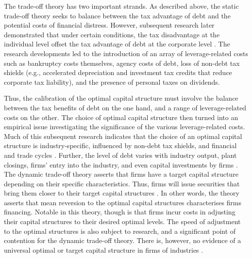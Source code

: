 \documentclass[a4paper, nobind]{templates/ociamthesis}
\begin{document}
The trade-off theory has two important strands. As described above, the static trade-off theory seeks to balance between the tax advantage of debt and the potential costs of financial distress. However, subsequent research later demonstrated that under certain conditions, the tax disadvantage at the individual level offset the tax advantage of debt at the corporate level \autocite{bradley1984existence}. The research developments led to the introduction of an array of leverage-related costs such as bankruptcy costs themselves, agency costs of debt, loss of non-debt tax shields (e.g., accelerated depreciation and investment tax credits that reduce corporate tax liability), and the presence of personal taxes on dividends.

Thus, the calibration of the optimal capital structure must involve the balance between the tax benefits of debt on the one hand, and a range of leverage-related costs on the other. The choice of optimal capital structure then turned into an empirical issue investigating the significance of the various leverage-related costs. Much of this subsequent research indicates that the choice of an optimal capital structure is industry-specific, influenced by non-debt tax shields, and financial and trade cycles \autocite{miao2005optimal}. Further, the level of debt varies with industry output, plant closings, firms' entry into the industry, and even capital investments by firms \autocite{myers2001capital}.
The dynamic trade-off theory asserts that firms have a target capital structure depending on their specific characteristics. Thus, firms will issue securities that bring them closer to their target capital structures \autocite{elsas2014financing}. In other words, the theory asserts that mean reversion to the optimal capital structures characterises firms financing. Notable in this theory, though is that firms incur costs in adjusting their capital structures to their desired optimal levels. The speed of adjustment to the optimal structures is also subject to research, and a significant point of contention for the dynamic trade-off theory. There is, however, no evidence of a universal optimal or target capital structure in firms of industries \autocite{elsas2015dynamic}.
\end{document}
